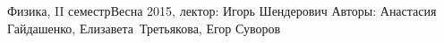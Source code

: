 


\BigHeader
	{Физика, II семестр}{Весна 2015, лектор: Игорь Шендерович}
	{Авторы: Анастасия Гайдашенко, Елизавета~Третьякова, Егор Суворов}
	

 








